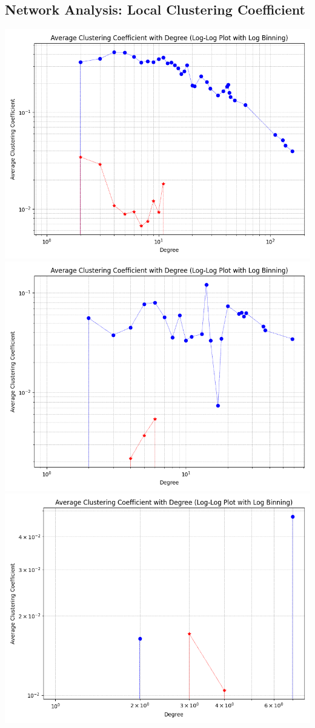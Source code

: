\documentclass[11pt]{article}
\begin{document}
\subsection{Network Analysis: Local Clustering Coefficient}
\includegraphics[scale=0.5]{ccanam.png}\\
\includegraphics[scale=0.5]{ccsf.png}\\
\includegraphics[scale=0.5]{ccrand.png}\\
\end{document}
